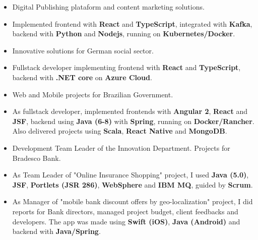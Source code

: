 \documentclass[10pt,a4paper,ragged2e,withhyper]{altacv}
\begin{document}
\begin{paracol}{2}


\begin{itemize}
\item Digital Publishing plataform and content marketing solutions.
\item Implemented frontend with \textbf{React} and \textbf{TypeScript}, integrated with \textbf{Kafka}, backend with \textbf{Python} and \textbf{Nodejs}, running on \textbf{Kubernetes/Docker}.
\end{itemize}
\divider

\begin{itemize}
\item Innovative solutions for German social sector.
\item Fullstack developer implementing frontend with \textbf{React} and \textbf{TypeScript}, backend
with \textbf{.NET core} on \textbf{Azure Cloud}.
\end{itemize}
\divider

\begin{itemize}
\item Web and Mobile projects for Brazilian Government.
\item As fullstack developer, implemented frontends with \textbf{Angular 2}, \textbf{React} and \textbf{JSF}, backend using \textbf{Java (6-8)} with \textbf{Spring}, running on \textbf{Docker/Rancher}.
Also delivered projects using \textbf{Scala}, \textbf{React Native} and \textbf{MongoDB}.
\end{itemize}
\divider

\begin{itemize}
\item Development Team Leader of the Innovation Department. Projects for Bradesco Bank.
\item As Team Leader of "Online Insurance Shopping" project, I used \textbf{Java (5.0)}, \textbf{JSF}, \textbf{Portlets (JSR 286)}, \textbf{WebSphere} and \textbf{IBM MQ}, guided by \textbf{Scrum}.
\item As Manager of "mobile bank discount offers by geo-localization" project, I did reports for Bank directors, managed project budget, client feedbacks and developers. The app was made using \textbf{Swift (iOS)}, \textbf{Java (Android)} and backend with \textbf{Java/Spring}.
\end{itemize}


\end{paracol}
\end{document}
